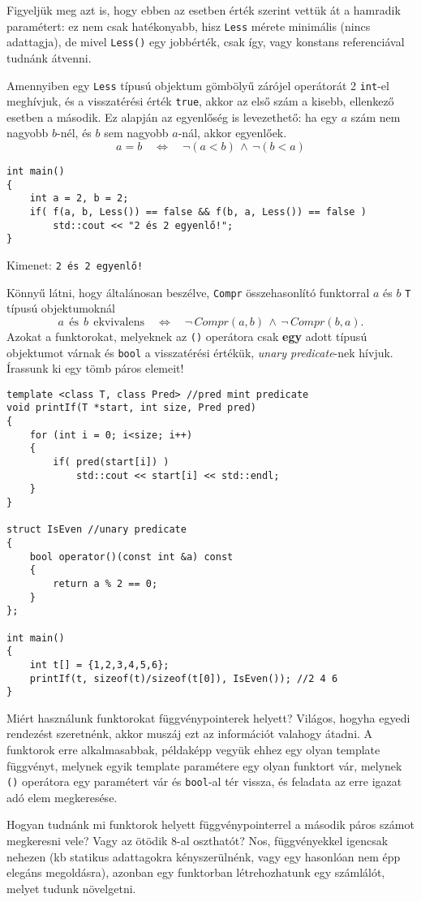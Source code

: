 \documentclass[../cpp_book/cpp_book.tex]{subfiles}
\begin{document}
	\begin{note}
		Figyeljük meg azt is, hogy ebben az esetben érték szerint vettük át a hamradik paramétert: ez nem csak hatékonyabb, hisz \texttt{Less} mérete minimális (nincs adattagja), de mivel \texttt{Less()} egy jobbérték, csak így, vagy konstans referenciával tudnánk átvenni.
	\end{note}
	
	Amennyiben egy \texttt{Less} típusú objektum gömbölyű zárójel operátorát 2 \texttt{int}-el meghívjuk, és a visszatérési érték \texttt{true}, akkor az első szám a kisebb, ellenkező esetben a második. Ez alapján az egyenlőség is levezethető: ha egy $a$ szám nem nagyobb $b$-nél, és $b$ sem nagyobb $a$-nál, akkor egyenlőek. 
	\[a = b \quad \Leftrightarrow \quad \neg(a<b)\, \wedge\, \neg(b<a)\]
	\begin{lstlisting}
int main()
{
	int a = 2, b = 2;
	if( f(a, b, Less()) == false && f(b, a, Less()) == false )
		std::cout << "2 és 2 egyenlő!";
}
	\end{lstlisting}
	Kimenet: \texttt{2 és 2 egyenlő!}
	\smallskip
	
	Könnyű látni, hogy általánosan beszélve, \texttt{Compr} összehasonlító funktorral $a$ és $b$ \texttt{T} típusú objektumoknál
	\[ a\ \ \text{és}\ \ b\ \ \text{ekvivalens}\quad \Leftrightarrow\quad \neg \,Compr(a, b)\, \wedge\, \neg \,Compr(b, a). \]
	Azokat a funktorokat, melyeknek az \texttt{()} operátora csak \textbf{egy} adott típusú objektumot várnak és \texttt{bool} a visszatérési értékük, \textit{unary predicate}-nek hívjuk. Írassunk ki egy tömb páros elemeit!
	\begin{lstlisting}
template <class T, class Pred> //pred mint predicate
void printIf(T *start, int size, Pred pred)
{
	for (int i = 0; i<size; i++)
	{
		if( pred(start[i]) )
			std::cout << start[i] << std::endl;
	}
}

struct IsEven //unary predicate
{
	bool operator()(const int &a) const
	{
		return a % 2 == 0;
	}
};

int main()
{
	int t[] = {1,2,3,4,5,6};
	printIf(t, sizeof(t)/sizeof(t[0]), IsEven()); //2 4 6
}
	\end{lstlisting}
	\begin{note}
		Miért használunk funktorokat függvénypointerek helyett? Világos, hogyha egyedi rendezést szeretnénk, akkor muszáj ezt az információt valahogy átadni. A funktorok erre alkalmasabbak, példaképp vegyük ehhez egy olyan template függvényt, melynek egyik template paramétere egy olyan funktort vár, melynek \texttt{()} operátora egy paramétert vár és \texttt{bool}-al tér vissza, és feladata az erre igazat adó elem megkeresése. 
		
		Hogyan tudnánk mi funktorok helyett függvénypointerrel a második páros számot megkeresni vele? Vagy az ötödik 8-al oszthatót? Nos, függvényekkel igencsak nehezen (kb statikus adattagokra kényszerülnénk, vagy egy hasonlóan nem épp elegáns megoldásra), azonban egy funktorban létrehozhatunk egy számlálót, melyet tudunk növelgetni.
	\end{note}
\end{document}

